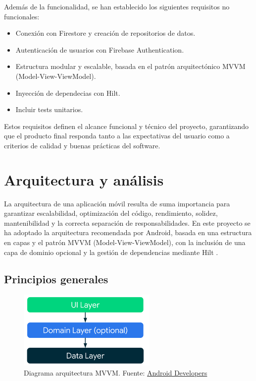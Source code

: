 Además de la funcionalidad, se han establecido los siguientes requisitos no funcionales:

\begin{itemize}
    \item Conexión con Firestore y creación de repositorios de datos.
    \item Autenticación de usuarios con Firebase Authentication.
    \item Estructura modular y escalable, basada en el patrón arquitectónico MVVM (Model-View-ViewModel).
    \item Inyección de dependecias con Hilt.
    \item Incluir tests unitarios.
\end{itemize}

Estos requisitos definen el alcance funcional y técnico del proyecto, garantizando que el producto final responda tanto a las expectativas del usuario como a criterios de calidad y buenas prácticas del software.

\section{Arquitectura y análisis}
\label{sec:arquitectura-analisis}

La arquitectura de una aplicación móvil resulta de suma importancia para garantizar escalabilidad, optimización del código, rendimiento, solidez, mantenibilidad y la correcta separación de responsabilidades. En este proyecto se ha adoptado la arquitectura recomendada por Android, basada en una estructura en capas y el patrón MVVM (Model-View-ViewModel), con la inclusión de una capa de dominio opcional y la gestión de dependencias mediante Hilt \cite{android-architecture, mvvm}.

\subsection{Principios generales}

\begin{figure}[H]
\centering
\includegraphics[width=0.6\textwidth]{./img/description/mvvm.png}
\caption{Diagrama arquitectura MVVM. Fuente: \href{https://developer.android.com/topic/architecture?hl=es-419}{Android Developers}}
\label{fig:mvvm}
\end{figure}

